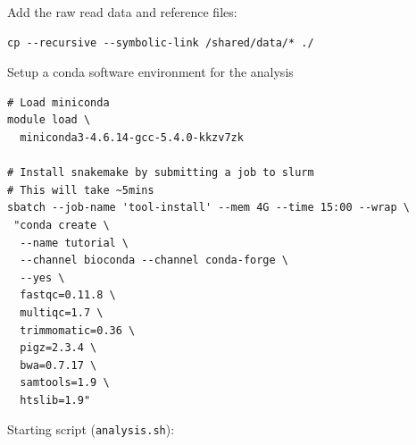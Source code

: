 Add the raw read data and reference files:

\begin{lstlisting}
cp --recursive --symbolic-link /shared/data/* ./
\end{lstlisting}

Setup a conda software environment for the analysis

\begin{lstlisting}
# Load miniconda
module load \
  miniconda3-4.6.14-gcc-5.4.0-kkzv7zk

# Install snakemake by submitting a job to slurm
# This will take ~5mins
sbatch --job-name 'tool-install' --mem 4G --time 15:00 --wrap \
 "conda create \
  --name tutorial \
  --channel bioconda --channel conda-forge \
  --yes \
  fastqc=0.11.8 \
  multiqc=1.7 \
  trimmomatic=0.36 \
  pigz=2.3.4 \
  bwa=0.7.17 \
  samtools=1.9 \
  htslib=1.9"
\end{lstlisting}

Starting script (\texttt{analysis.sh}):

